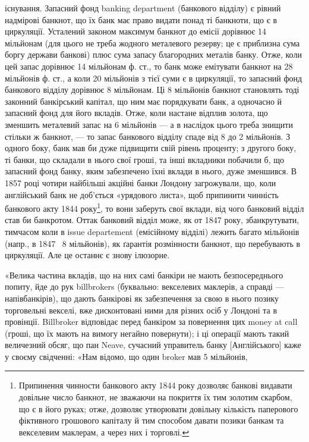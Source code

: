 існування. Запасний фонд banking department (банкового відділу) є рівний
надмірові банкнот, що їх банк має право видати понад ті банкноти, що є в
циркуляції. Усталений законом максимум банкнот до емісії дорівнює 14 мільйонам
(для цього не треба жодного металевого резерву; це є приблизна сума боргу
держави банкові) плюс сума запасу благородних металів банку. Отже, коли цей запас
дорівнює 14 мільйонам ф. ст., то банк може емітувати банкнот на 28 мільйонів ф. ст.,
а коли 20 мільйонів з тієї суми є в циркуляції, то запасний фонд банкового відділу
дорівнює 8 мільйонам. Ці 8 мільйонів банкнот становлять тоді законний банкірський
капітал, що ним має порядкувати банк, а одночасно й запасний фонд для його
вкладів. Отже, коли настане відплив золота, що зменшить металевий запас на
6 мільйонів — а в наслідок цього треба знищити стільки ж банкнот, — то запас
банкового відділу спаде від 8 до 2 мільйонів. З одного боку, банк мав би дуже
підвищити свій рівень проценту; з другого боку, ті банки, що складали в нього
свої гроші, та інші вкладники побачили б, що запасний фонд банку, яким забезпечено
їхні вклади в нього, дуже зменшився. В 1857 році чотири найбільші
акційні банки Лондону загрожували, що, коли англійський банк не доб’ється «урядового листа», щоб
припинити чинність банкового акту 1844 року\footnote{Припинення чинности банкового акту 1844 року дозволяє банкові видавати довільне число банкнот, не
зважаючи на покриття їх тим золотим скарбом, що є в його руках; отже, дозволяє утворювати довільну
кількість паперового фіктивного грошового капіталу й тим способом давати позики банкам та векселевим
маклерам, а через них і торговлі.}, то вони
заберуть свої вклади, від чого банковий відділ став би банкротом. Оттак банковий
відділ може, як от 1847 року, збанкрутувати, тимчасом коли в issue departement
(емісійному відділі) лежить багато мільйонів (напр., в 1847~ 8 мільйонів),
як ґарантія розмінности банкнот, що перебувають в циркуляції. Але це
останнє є знову ілюзорне.

«Велика частина вкладів, що на них самі банкіри не мають безпосереднього
попиту, йде до рук billbrokers (буквально: векселевих маклерів, а справді —
напівбанкірів), що дають банкірові як забезпечення за свою в нього позику
торговельні векселі, вже дисконтовані ними для різних осіб у Лондоні та в
провінції. Billbroker відповідає перед банкіром за повернення цих money at
call (гроші, що їх мають на вимогу негайно повернути); і ці операції мають
такий величезний обсяг, що пан Neave, сучасний управитель банку [Англійського]
каже у своєму свідченні: «Нам відомо, що один broker мав 5 мільйонів,
\parbreak{}  %
